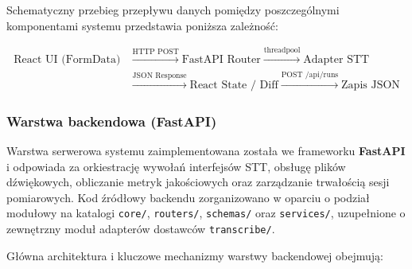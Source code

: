 Schematyczny przebieg przepływu danych pomiędzy poszczególnymi komponentami systemu przedstawia poniższa zależność:

\begin{equation}
\begin{aligned}
    \text{React UI (FormData)}
    &\xrightarrow{\text{HTTP POST}} \text{FastAPI Router}
    \xrightarrow{\text{threadpool}} \text{Adapter STT}\\
    &\xrightarrow{\text{JSON Response}} \text{React State / Diff}
    \xrightarrow{\text{POST /api/runs}} \text{Zapis JSON}
\end{aligned}
\end{equation}

\subsubsection{Warstwa backendowa (FastAPI)}
\label{subsubsec:backend_layer}

Warstwa serwerowa systemu zaimplementowana została we frameworku \textbf{FastAPI} i odpowiada za orkiestrację wywołań interfejsów STT, obsługę plików dźwiękowych, obliczanie metryk jakościowych oraz zarządzanie trwałością sesji pomiarowych. Kod źródłowy backendu zorganizowano w oparciu o podział modułowy na katalogi \texttt{core/}, \texttt{routers/}, \texttt{schemas/} oraz \texttt{services/}, uzupełnione o zewnętrzny moduł adapterów dostawców \texttt{transcribe/}.

Główna architektura i kluczowe mechanizmy warstwy backendowej obejmują:


